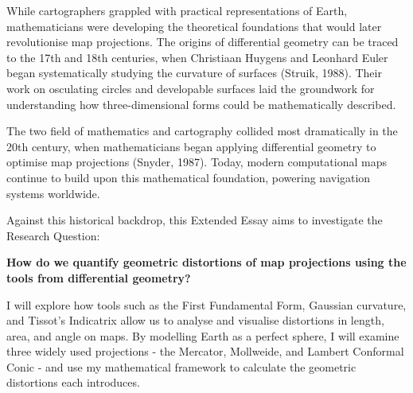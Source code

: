 While cartographers grappled with practical representations of Earth, 
mathematicians were developing the theoretical foundations that would later 
revolutionise map projections. The origins of differential geometry can be 
traced to the 17th and 18th centuries, when Christiaan Huygens and Leonhard 
Euler began systematically studying the curvature of surfaces (Struik, 1988). 
Their work on osculating circles and developable surfaces laid the groundwork 
for understanding how three-dimensional forms could be mathematically 
described.

The two field of mathematics and cartography collided most dramatically in the 
20th century, when mathematicians began applying differential geometry to 
optimise map projections (Snyder, 1987). Today, modern computational maps 
continue to build upon this mathematical foundation, powering navigation 
systems worldwide. 

Against this historical backdrop, this Extended Essay aims to investigate the 
Research Question:

\textbf{How do we quantify geometric distortions of map projections using the tools from 
differential geometry?}

I will explore how tools such as the First Fundamental Form, Gaussian 
curvature, and Tissot's Indicatrix allow us to analyse and visualise 
distortions in length, area, and angle on maps. By modelling Earth as a 
perfect sphere, I will examine three widely used projections - the Mercator, 
Mollweide, and Lambert Conformal Conic - and use my mathematical framework to 
calculate the geometric distortions each introduces.
